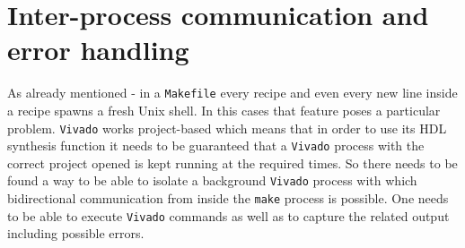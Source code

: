 \section{Inter-process communication and error handling}

As already mentioned - in a \texttt{Makefile} every recipe and even every new line inside a recipe spawns a fresh Unix shell. In this cases that feature poses a particular problem. \texttt{Vivado} works project-based which means that in order to use its \acs{HDL} synthesis function it needs to be guaranteed that a \texttt{Vivado} process with the correct project opened is kept running at the required times. So there needs to be found a way to be able to isolate a background \texttt{Vivado} process with which bidirectional communication from inside the \texttt{make} process is possible. One needs to be able to execute \texttt{Vivado} commands as well as to capture the related output including possible errors. 

